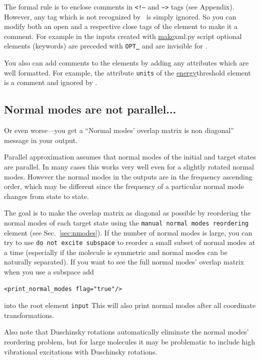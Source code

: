 \documentclass[11pt]{article}
\begin{document}
The formal rule is to enclose comments in {\tt <!--} and {\tt -->} tags (see Appendix).
However, any tag which is not recognized by \ezFCF\ is simply ignored.
So you can modify both an open and a respective close tags of the element to make it a comment.
For example in the inputs created with \ul{make}{xml.py} script optional elements (keywords)
are preceded with {\tt OPT\underline{~}} and are invisible for \ezFCF.

You also can add comments to the elements by adding any attributes which are well formatted. 
For example, the attribute {\tt units} of the \ul{energy}{threshold} element is
a comment and ignored by \ezFCF.


\subsection{Normal modes are not parallel...}
\label{sec:nonparallel}
Or even worse---you get a ``Normal modes' overlap matrix is non diagonal'' message in your output.

Parallel approximation assumes that normal modes of the initial and target states are parallel.
In many cases this works very well even for a slightly rotated normal modes. 
However the normal modes in the \ai outputs are in the frequency ascending order,
which may be different since the frequency of a particular normal mode changes from state to state. 

The goal is to make the overlap matrix as diagonal as possible by reordering
the normal modes of each target state using the {\tt manual normal modes reordering} element
(see Sec.~\ref{sec:nmodes}). 
If the number of normal modes is large, you can try to use {\tt do not excite subspace}
to reorder a small subset of normal modes at a time
(especially if the molecule is symmetric and normal modes can be naturally separated).
If you want to see the full normal modes' overlap matrix when you use a subspace add
\begin{lstlisting}[frame=single,framerule=0pt]
<print_normal_modes flag="true"/>
\end{lstlisting}
into the root element {\tt input}
This will also print normal modes after all coordinate transformations.


Also note that Duschinsky rotations automatically eliminate the normal modes' reordering problem, but for
large molecules it may be problematic to include high vibrational excitations with Duschinsky rotations.
\end{document}
